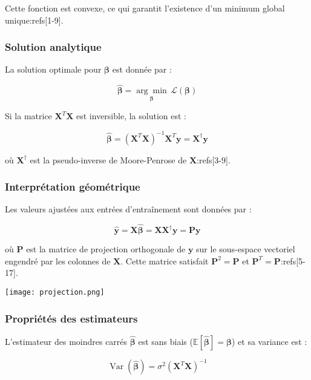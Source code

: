 \documentclass[10pt,a4paper]{article}
\begin{document}
Cette fonction est convexe, ce qui garantit l'existence d'un minimum global unique:refs[1-9].

\subsubsection*{Solution analytique}

La solution optimale pour $\boldsymbol{\beta}$ est donnée par :

$$
\hat{\boldsymbol{\beta}} = \underset{\boldsymbol{\beta}}{\arg \min} \, \mathcal{L}(\boldsymbol{\beta})
$$

Si la matrice $\mathbf{X}^{T} \mathbf{X}$ est inversible, la solution est :

$$
\hat{\boldsymbol{\beta}} = (\mathbf{X}^{T} \mathbf{X})^{-1} \mathbf{X}^{T} \mathbf{y} = \mathbf{X}^{\dagger} \mathbf{y}
$$

où $\mathbf{X}^{\dagger}$ est la pseudo-inverse de Moore-Penrose de $\mathbf{X}$:refs[3-9].

\subsubsection*{Interprétation géométrique}

Les valeurs ajustées aux entrées d'entraînement sont données par :

$$
\hat{\mathbf{y}} = \mathbf{X} \hat{\boldsymbol{\beta}} = \mathbf{X} \mathbf{X}^{\dagger} \mathbf{y} = \mathbf{P} \mathbf{y}
$$

où $\mathbf{P}$ est la matrice de projection orthogonale de $\mathbf{y}$ sur le sous-espace vectoriel engendré par les colonnes de $\mathbf{X}$. Cette matrice satisfait $\mathbf{P}^2 = \mathbf{P}$ et $\mathbf{P}^T = \mathbf{P}$:refs[5-17].

\texttt{[image: projection.png]}

\subsubsection*{Propriétés des estimateurs}

L'estimateur des moindres carrés $\hat{\boldsymbol{\beta}}$ est sans biais ($\mathbb{E}[\hat{\boldsymbol{\beta}}] = \boldsymbol{\beta}$) et sa variance est :

$$
\operatorname{Var}(\hat{\boldsymbol{\beta}}) = \sigma^{2}(\mathbf{X}^{T} \mathbf{X})^{-1}
$$
\end{document}
